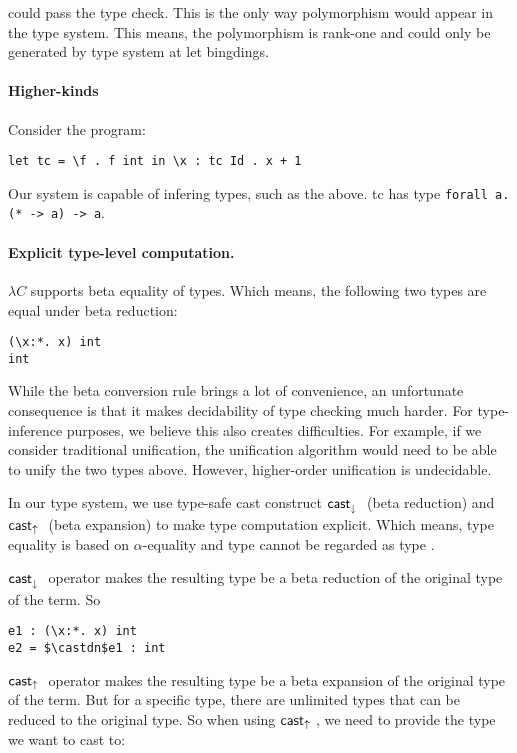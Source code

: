 could pass the type check. This is the only way polymorphism would
appear in the type system. This means, the polymorphism is rank-one
and could only be generated by type system at let bingdings.

\paragraph{Higher-kinds} Consider the program:

\begin{lstlisting}
let tc = \f . f int in \x : tc Id . x + 1 
\end{lstlisting}

Our system is capable of infering types, such as the above. 
\lst tc has type \lstinline{forall a. (* -> a) -> a}.


\paragraph{Explicit type-level computation.} $\lambda C$ supports beta
equality of types. Which means, the following two types are equal
under beta reduction:

\begin{lstlisting}
(\x:*. x) int
int
\end{lstlisting}

While the beta conversion rule brings a lot of convenience, an
unfortunate consequence is that it makes decidability of type
checking much harder. For type-inference purposes, we believe 
this also creates difficulties. For example, if we consider
traditional unification, the unification algorithm would need 
to be able to unify the two types above. However, higher-order 
unification is undecidable.  

In our type system, we use type-safe cast construct $\mathsf{cast}_\downarrow^{}~$ (beta
reduction) and $\mathsf{cast}_\uparrow~$ (beta expansion) to make type computation
explicit. Which means, type equality is based on $\alpha$-equality and
type  cannot be regarded as type .

$\mathsf{cast}_\downarrow^{}~$ operator makes the resulting type be a beta reduction of the
original type of the term. So

\begin{lstlisting}
e1 : (\x:*. x) int
e2 = $\castdn$e1 : int
\end{lstlisting}

$\mathsf{cast}_\uparrow~$ operator makes the resulting type be a beta expansion of
the original type of the term. But for a specific type, there are
unlimited types that can be reduced to the original type. So when
using $\mathsf{cast}_\uparrow~$, we need to provide the type we want to cast to:

